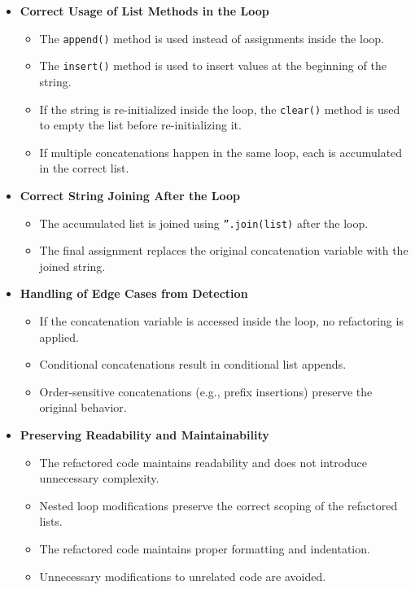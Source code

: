 \documentclass[12pt, titlepage]{article}
\begin{document}
\begin{enumerate}[label={\bf \textcolor{Maroon}{test-SRT-\arabic*}}, wide=0pt, font=\itshape]
\begin{itemize}
    \item \textbf{Correct Usage of List Methods in the Loop}
    \begin{itemize}
        \item The \texttt{append()} method is used instead of assignments inside the loop.
        \item The \texttt{insert()} method is used to insert values at the beginning of the string.
        \item If the string is re-initialized inside the loop, the \texttt{clear()} method is used to empty the list before re-initializing it.
        \item If multiple concatenations happen in the same loop, each is accumulated in the correct list.
    \end{itemize}

    \item \textbf{Correct String Joining After the Loop}
    \begin{itemize}
        \item The accumulated list is joined using \texttt{''.join(list)} after the loop.
        \item The final assignment replaces the original concatenation variable with the joined string.
    \end{itemize}

    \item \textbf{Handling of Edge Cases from Detection}
    \begin{itemize}
        \item If the concatenation variable is accessed inside the loop, no refactoring is applied.
        \item Conditional concatenations result in conditional list appends.
        \item Order-sensitive concatenations (e.g., prefix insertions) preserve the original behavior.
    \end{itemize}

    \item \textbf{Preserving Readability and Maintainability}
    \begin{itemize}
        \item The refactored code maintains readability and does not introduce unnecessary complexity.
        \item Nested loop modifications preserve the correct scoping of the refactored lists.
        \item The refactored code maintains proper formatting and indentation.
        \item Unnecessary modifications to unrelated code are avoided.
    \end{itemize}
\end{itemize}


\end{enumerate}
\end{document}
